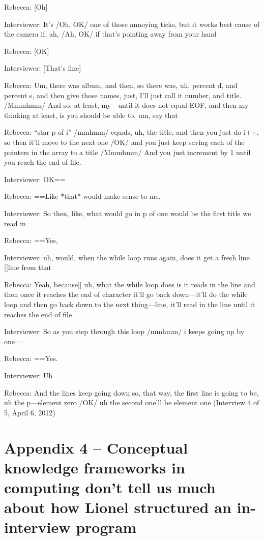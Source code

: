 Rebecca: {[}Oh{]}

Interviewer: It's /Oh, OK/ one of those annoying ticks, but it works
best cause of the camera if, ah, /Ah, OK/ if that's pointing away from
your hand

Rebecca: {[}OK{]}

Interviewer: {[}That's fine{]}

Rebecca: Um, there was album, and then, so there was, uh, percent d, and
percent s, and then give those names, just, I'll just call it number,
and title. /Mmmhmm/ And so, at least, my---until it does not equal EOF,
and then my thinking at least, is you should be able to, um, say that

Rebecca: ``star p of i'' /mmhmm/ equals, uh, the title, and then you
just do i++, so then it'll move to the next one /OK/ and you just keep
saving each of the pointers in the array to a title /Mmmhmm/ And you
just increment by 1 until you reach the end of file.

Interviewer: OK==

Rebecca: ==Like *that* would make sense to me.

Interviewer: So then, like, what would go in p of one would be the first
title we read in==

Rebecca: ==Yes,

Interviewer: uh, would, when the while loop runs again, does it get a
fresh line {[}{[}line from that

Rebecca: Yeah, because{]}{]} uh, what the while loop does is it reads in
the line and then once it reaches the end of character it'll go back
down---it'll do the while loop and then go back down to the next
thing---line, it'll read in the line until it reaches the end of file

Interviewer: So as you step through this loop /mmhmm/ i keeps going up
by one==

Rebecca: ==Yes.

Interviewer: Uh

Rebecca: And the lines keep going down so, that way, the first line is
going to be, uh the p---element zero /OK/ uh the second one'll be
element one (Interview 4 of 5, April 6, 2012)

\section{Appendix 4 -- Conceptual knowledge frameworks in computing
don't tell us much about how Lionel structured an in-interview
program}\label{appendix-4-conceptual-knowledge-frameworks-in-computing-dont-tell-us-much-about-how-lionel-structured-an-in-interview-program}

